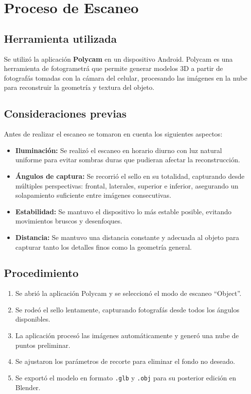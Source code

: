 \documentclass[12pt,a4paper]{article}
\begin{document}
\section{Proceso de Escaneo}

\subsection{Herramienta utilizada}

Se utiliz\'o la aplicaci\'on \textbf{Polycam} en un dispositivo Android. Polycam es una herramienta de fotogrametr\'a que permite generar modelos 3D a partir de fotograf\'as tomadas con la c\'amara del celular, procesando las im\'agenes en la nube para reconstruir la geometr\'ia y textura del objeto.

\subsection{Consideraciones previas}

Antes de realizar el escaneo se tomaron en cuenta los siguientes aspectos:

\begin{itemize}
    \item \textbf{Iluminaci\'on:} Se realiz\'o el escaneo en horario diurno con luz natural uniforme para evitar sombras duras que pudieran afectar la reconstrucci\'on.
    \item \textbf{\'Angulos de captura:} Se recorri\'o el sello en su totalidad, capturando desde m\'ultiples perspectivas: frontal, laterales, superior e inferior, asegurando un solapamiento suficiente entre im\'agenes consecutivas.
    \item \textbf{Estabilidad:} Se mantuvo el dispositivo lo m\'as estable posible, evitando movimientos bruscos y desenfoques.
    \item \textbf{Distancia:} Se mantuvo una distancia constante y adecuada al objeto para capturar tanto los detalles finos como la geometr\'ia general.
\end{itemize}

\subsection{Procedimiento}

\begin{enumerate}
    \item Se abri\'o la aplicaci\'on Polycam y se seleccion\'o el modo de escaneo ``Object''.
    \item Se rode\'o el sello lentamente, capturando fotograf\'as desde todos los \'angulos disponibles.
    \item La aplicaci\'on proces\'o las im\'agenes autom\'aticamente y gener\'o una nube de puntos preliminar.
    \item Se ajustaron los par\'ametros de recorte para eliminar el fondo no deseado.
    \item Se export\'o el modelo en formato \texttt{.glb} y \texttt{.obj} para su posterior edici\'on en Blender.
\end{enumerate}
\end{document}
